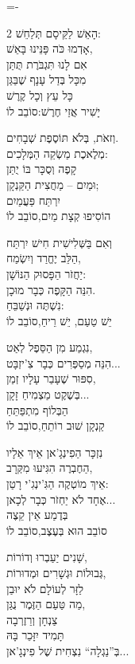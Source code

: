 \documentclass[11pt,twoside]{article}
\begin{document}
{{{%
\setlength{\columnseprule}{0.4pt}%
\setlength{\columnsep}{2.8em}%
\lineskiplimit=-\maxdimen%
\footnotesize%
\begin{multicols}{2}
הָאֵשׁ לַקֵּיסָם תְּלַחֵשׁ:\\
אָדְמוּ כֹּה פָּנֵּינוּ בָּאֵשׁ,\\
אִם לָנוּ תִּגְבֹּרֶת תֻּתַּן\\
מִכָּל בְּדַל עָנָף שֶׁבַּגַּן \textemdash{}\\
כָּל עֵץ וְכָל קֶרֶשׁ\\
יָשִׁיר אֲזַי חֶרֶשׁ:\hfill{\scriptsize סוֹבֵב לוֹ}

וְזאֹת, בְּלֹא תּוֹסֶפֶת שְׁבָחִים.\\
מְלֶאכֶת מַשְׂקֵה הַמְּלָכִים:\\
קָפֶה וְסֻכָּר בּוֹ יֻתַּן\\
וּמַיִם – מַחֲצִית הַקַּנְקָן;\\
יִרְתַּח פַּעֲמַיִם \textemdash{}\\
הוֹסִיפוּ קְצָת מַיִם,\hfill{\scriptsize סוֹבֵב לוֹ}

וְאִם בַּשְּׁלִישִׁית חִישׁ יִרְתַּח \textemdash{}\\
הַלֵּב יֶחֱרַד וְיִשְׂמַח,\\
יַחֲזֹר הַפָּסוּק הַנּוֹשָׁן:\\
הִנֵּה הַקָּפֶה כְּבָר מוּכָן.\\
נִשְׁתֶּה וּנְשַׁבֵּחַ:\\
יֵשׁ טַעַם, יֵשׁ רֵיחַ,\hfill{\scriptsize סוֹבֵב לוֹ}

נִגְמַע מִן הַסֵּפֶל לְאַט,\\
הִנֵּה מְסַפְּרִים כְּבָר צִ'יזְבָּט...\\
סִפּוּר שֶׁעָבַר עָלָיו זְמַן,\\
בְּשֶׁקֶט מַצְמִיחַ זָקָן...\\
הַבְּלוֹף מִתְפַּתֵּחַ \textemdash{}\\
קַנְקָן שׁוּב רוֹתֵחַ,\hfill{\scriptsize סוֹבֵב לוֹ}

נִזְכָּר הַפִינְגָ'אן אֵיךְ אֵלָיו\\
הַחֶבְרֶה הִגִּיעוּ מִקְּרָב,\\
אֵיךְ מוֹטְקֶה הַגִּ'ינְגִ'י רָטַן:\\
אֶחָד לֹא יַחְזֹר כְּבָר לְכָאן...\\
בְּדֶמַע אֵין קֵצֶה\\
סוֹבֵב הוּא בְּעֶצֶב,\hfill{\scriptsize סוֹבֵב לוֹ}

שָׁנִים יַעַבְרוּ וְדוֹרוֹת,\\
גְּבוּלוֹת וּגְשָׁרִים וּמְדוּרוֹת,\\
לַזָּר לְעוֹלָם לֹא יוּבַן\\
מַה טַּעַם הַזֶּמֶר נֻגַּן, \textemdash{}\\
צַנְחָן וְרֵזֶרְבָה\\
תָּמִיד יִזָּכֵר בָּהּ \textemdash{}\\
בְּ”נַגְלָה“ נִצְחִית שֶׁל פִינְגָ'אן...
\end{multicols}
}


}}
\end{document}
